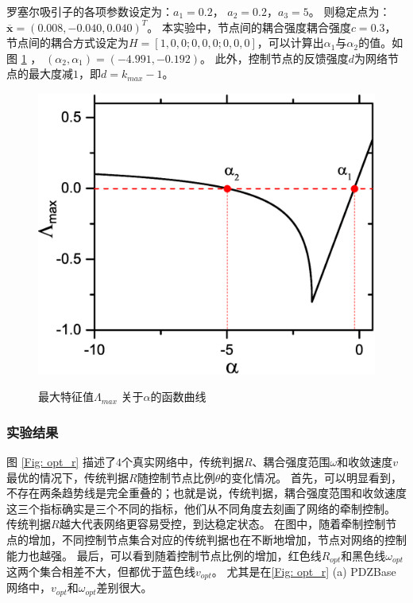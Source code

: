 罗塞尔吸引子的各项参数设定为：$  a_1=0.2 $， $ a_2=0.2 $，$ a_3=5 $。
则稳定点为：$ \overline{\textbf{x}}=(0.008, -0.040, 0.040)^T $。
本实验中，节点间的耦合强度耦合强度$ c=0.3 $，节点间的耦合方式设定为$ H = [1,0,0;0,0,0;0,0,0] $，可以计算出$ \alpha_1 $与$ \alpha_2 $的值。如图 \ref{Fig: rossler} ， $ (\alpha_2,\alpha_1)=(-4.991, -0.192) $。
此外，控制节点的反馈强度$ d $为网络节点的最大度减$ 1 $，即$ d = k_{max}-1 $。


\begin{figure}[ht]%
	\centering
	\includegraphics[width=0.5\columnwidth]{chapter3Fig/rossler.eps}\\
	\caption{最大特征值$ \Lambda_{max}$ 关于$\alpha$的函数曲线 }
	\label{Fig: rossler}	
	
\end{figure}

\subsubsection{实验结果}
图 \ref{Fig: opt_r} 描述了$ 4 $个真实网络中，传统判据$ R $、耦合强度范围$ \omega $和收敛速度$ v $最优的情况下，传统判据$ R $随控制节点比例$ \theta $的变化情况。
首先，可以明显看到，不存在两条趋势线是完全重叠的；也就是说，传统判据，耦合强度范围和收敛速度这三个指标确实是三个不同的指标，他们从不同角度去刻画了网络的牵制控制。
传统判据$ R $越大代表网络更容易受控，到达稳定状态。
在图中，随着牵制控制节点的增加，不同控制节点集合对应的传统判据也在不断地增加，节点对网络的控制能力也越强。
最后，可以看到随着控制节点比例的增加，红色线$ R_{opt} $和黑色线$ \omega_{opt} $这两个集合相差不大，但都优于蓝色线$ v_{opt} $。
尤其是在\ref{Fig: opt_r} (a) PDZBase 网络中，$ v_{opt} $和$ \omega_{opt} $差别很大。

